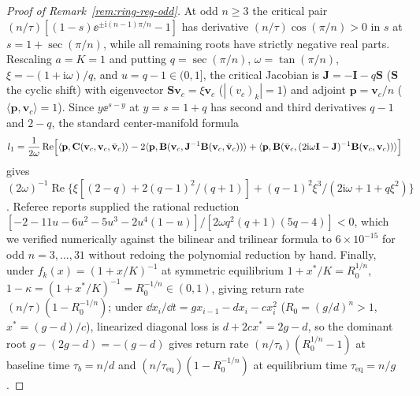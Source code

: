\begin{proof}[Proof of Remark~{\upshape\ref{rem:ring-reg-odd}}]
At odd $n \ge 3$ the critical pair $(n/\tau)[(1 - s)\ee^{\pm\mathrm{i}(n-1)\pi/n} - 1]$ has derivative $(n/\tau)\cos(\pi/n) > 0$ in $s$ at $s = 1 + \sec(\pi/n)$, while all remaining roots have strictly negative real parts. Rescaling $a = K = 1$ and putting $q = \sec(\pi/n)$, $\omega = \tan(\pi/n)$, $\xi = -(1 + \mathrm{i}\omega)/q$, and $u = q - 1 \in (0, 1]$, the critical Jacobian is $\mathbf{J} = -\mathbf{I} - q\mathbf{S}$ ($\mathbf{S}$ the cyclic shift) with eigenvector $\mathbf{S}\mathbf{v}_c = \xi\mathbf{v}_c$ ($|(v_c)_k| = 1$) and adjoint $\mathbf{p} = \mathbf{v}_c/n$ ($\langle\mathbf{p}, \mathbf{v}_c\rangle = 1$). Since $y\ee^{s - y}$ at $y = s = 1 + q$ has second and third derivatives $q - 1$ and $2 - q$, the standard center-manifold formula
\[
l_1 = \frac{1}{2\omega}\operatorname{Re}\Bigl[\langle\mathbf{p}, \mathbf{C}(\mathbf{v}_c, \mathbf{v}_c, \bar{\mathbf{v}}_c)\rangle - 2\langle\mathbf{p}, \mathbf{B}(\mathbf{v}_c, \mathbf{J}^{-1}\mathbf{B}(\mathbf{v}_c, \bar{\mathbf{v}}_c))\rangle + \langle\mathbf{p}, \mathbf{B}(\bar{\mathbf{v}}_c, (2\mathrm{i}\omega\mathbf{I} - \mathbf{J})^{-1}\mathbf{B}(\mathbf{v}_c, \mathbf{v}_c))\rangle\Bigr]
\]
gives $(2\omega)^{-1}\operatorname{Re}\{\xi[(2 - q) + 2(q - 1)^2/(q + 1)] + (q - 1)^2\xi^3/(2\mathrm{i}\omega + 1 + q\xi^2)\}$. Referee reports supplied the rational reduction $[-2 - 11u - 6u^2 - 5u^3 - 2u^4(1 - u)]/[2\omega q^2(q + 1)(5q - 4)] < 0$, which we verified numerically against the bilinear and trilinear formula to $6 \times 10^{-15}$ for odd $n = 3, \dots, 31$ without redoing the polynomial reduction by hand. Finally, under $f_k(x) = (1 + x/K)^{-1}$ at symmetric equilibrium $1 + x^*/K = R_0^{1/n}$, $1 - \kappa = (1 + x^*/K)^{-1} = R_0^{-1/n} \in (0, 1)$, giving return rate $(n/\tau)(1 - R_0^{-1/n})$; under $\dd x_i/\dd t = g x_{i-1} - d x_i - c x_i^2$ ($R_0 = (g/d)^n > 1$, $x^* = (g - d)/c$), linearized diagonal loss is $d + 2c x^* = 2g - d$, so the dominant root $g - (2g - d) = -(g - d)$ gives return rate $(n/\tau_b)(R_0^{1/n} - 1)$ at baseline time $\tau_b = n/d$ and $(n/\tau_{\mathrm{eq}})(1 - R_0^{-1/n})$ at equilibrium time $\tau_{\mathrm{eq}} = n/g$.
\end{proof}
